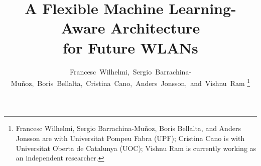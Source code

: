 \documentclass[journal]{IEEEtran}
\begin{document}
%
\title{A Flexible Machine Learning-Aware Architecture\\ for Future WLANs}
%
%
%

\author{Francesc~Wilhelmi,~Sergio~Barrachina-Mu\~noz,~Boris~Bellalta,~Cristina~Cano,~Anders~Jonsson,~and~Vishnu~Ram%
\thanks{Francesc Wilhelmi, Sergio Barrachina-Mu\~noz, Boris Bellalta, and Anders Jonsson are with Universitat Pompeu Fabra (UPF); Cristina Cano is with Universitat Oberta de Catalunya (UOC); Vishnu Ram is currently working as an independent researcher.}%
}

% 
%



% 
\end{document}
